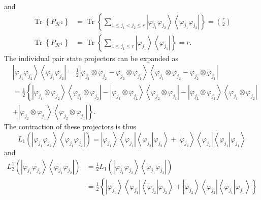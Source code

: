 \documentclass[aps,preprint]{revtex4}%
\begin{document}
and
\begin{align}
\operatorname*{Tr}\left\{  P_{\mathcal{H}^{2}}\right\}   &
=\operatorname*{Tr}\left\{  \sum_{1\leq j_{1}<j_{2}\leq r}\left\vert
\varphi_{j_{1}}\varphi_{j_{2}}\right\rangle \left\langle \varphi_{j_{1}%
}\varphi_{j_{2}}\right\vert \right\}  =\binom{r}{2}\\
\operatorname*{Tr}\left\{  P_{\mathcal{H}^{1}}\right\}   &
=\operatorname*{Tr}\left\{  \sum_{1\leq j_{1}\leq r}\left\vert \varphi_{j_{1}%
}\right\rangle \left\langle \varphi_{j_{1}}\right\vert \right\}  =r.
\end{align}
The individual pair state projectors can be expanded as
\begin{align}
&  \left\vert \varphi_{j_{1}}\varphi_{j_{2}}\right\rangle \left\langle
\varphi_{j_{1}}\varphi_{j_{2}}\right\vert =\frac{1}{2}\left\vert
\varphi_{j_{1}}\otimes\varphi_{j_{2}}-\varphi_{j_{2}}\otimes\varphi_{j_{1}%
}\right\rangle \left\langle \varphi_{j_{1}}\otimes\varphi_{j_{2}}%
-\varphi_{j_{2}}\otimes\varphi_{j_{1}}\right\vert \nonumber\\
&  =\frac{1}{2}\left\{  \left\vert \varphi_{j_{1}}\otimes\varphi_{j_{2}%
}\right\rangle \left\langle \varphi_{j_{1}}\otimes\varphi_{j_{2}}\right\vert
-\left\vert \varphi_{j_{1}}\otimes\varphi_{j_{2}}\right\rangle \left\langle
\varphi_{j_{2}}\otimes\varphi_{j_{1}}\right\vert -\left\vert \varphi_{j_{2}%
}\otimes\varphi_{j_{1}}\right\rangle \left\langle \varphi_{j_{1}}%
\otimes\varphi_{j_{2}}\right\vert \right. \nonumber\\
&  \left.  +\left\vert \varphi_{j_{2}}\otimes\varphi_{j_{1}}\right\rangle
\left\langle \varphi_{j_{2}}\otimes\varphi_{j_{1}}\right\vert \right\}  .
\end{align}
The contraction of these projectors is thus%
\begin{equation}
L_{1}\left(  \left\vert \varphi_{j_{1}}\varphi_{j_{2}}\right\rangle
\left\langle \varphi_{j_{1}}\varphi_{j_{2}}\right\vert \right)  =\left\vert
\varphi_{j_{1}}\right\rangle \left\langle \varphi_{j_{1}}\right\vert
\left\langle \varphi_{j_{2}}\left\vert \varphi_{j_{2}}\right.  \right\rangle
+\left\vert \varphi_{j_{2}}\right\rangle \left\langle \varphi_{j_{2}%
}\right\vert \left\langle \varphi_{j_{1}}\left\vert \varphi_{j_{1}}\right.
\right\rangle
\end{equation}
and%
\begin{align}
L_{2}^{1}\left(  \left\vert \varphi_{j_{1}}\varphi_{j_{2}}\right\rangle
\left\langle \varphi_{j_{1}}\varphi_{j_{2}}\right\vert \right)   &  =\frac
{1}{2}L_{1}\left(  \left\vert \varphi_{j_{1}}\varphi_{j_{2}}\right\rangle
\left\langle \varphi_{j_{1}}\varphi_{j_{2}}\right\vert \right) \nonumber\\
&  =\frac{1}{2}\left\{  \left\vert \varphi_{j_{1}}\right\rangle \left\langle
\varphi_{j_{1}}\right\vert \left\langle \varphi_{j_{2}}\left\vert
\varphi_{j_{2}}\right.  \right\rangle +\left\vert \varphi_{j_{2}}\right\rangle
\left\langle \varphi_{j_{2}}\right\vert \left\langle \varphi_{j_{1}}\left\vert
\varphi_{j_{1}}\right.  \right\rangle \right\}
\end{align}
\end{document}
